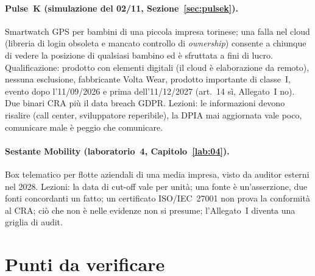 \paragraph{Pulse~K (simulazione del 02/11, Sezione~\ref{sec:pulsek}).} Smartwatch GPS per bambini di una
piccola impresa torinese; una falla nel cloud (libreria di login obsoleta e mancato controllo di
\emph{ownership}) consente a chiunque di vedere la posizione di qualsiasi bambino ed è sfruttata a fini
di lucro. Qualificazione: prodotto con elementi digitali (il cloud è elaborazione da remoto), nessuna
esclusione, fabbricante Volta Wear, prodotto importante di classe~I, evento dopo l'11/09/2026 e prima
dell'11/12/2027 (art.~14 sì, Allegato~I no). Due binari CRA più il data breach GDPR. Lezioni: le
informazioni devono risalire (call center, sviluppatore reperibile), la DPIA mai aggiornata vale poco,
comunicare male è peggio che comunicare.

\paragraph{Sestante Mobility (laboratorio~4, Capitolo~\ref{lab:04}).} Box telematico per flotte aziendali
di una media impresa, visto da auditor esterni nel 2028. Lezioni: la data di cut-off vale per unità; una
fonte è un'asserzione, due fonti concordanti un fatto; un certificato ISO/IEC~27001 non prova la
conformità al CRA; ciò che non è nelle evidenze non si presume; l'Allegato~I diventa una griglia di audit.

\section{Punti da verificare}
\label{sec:cra-verifica}

